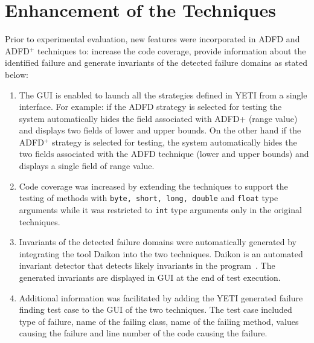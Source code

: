 \section{Enhancement of the Techniques}
Prior to experimental evaluation, new features were incorporated in ADFD and ADFD$^+$ techniques to: increase the code coverage, provide information about the identified failure and generate invariants of the detected failure domains as stated below: 
\begin{enumerate}

\item The GUI is enabled to launch all the strategies defined in YETI from a single interface. For example: if the ADFD strategy is selected for testing the system automatically hides the field associated with ADFD+ (range value) and displays two fields of lower and upper bounds. On the other hand if the ADFD$^+$ strategy is selected for testing, the system automatically hides the two fields associated with the ADFD technique (lower and upper bounds) and displays a single field of range value.

\clearpage
\newpage 

\item Code coverage was increased by extending the techniques to support the testing of methods with \verb+byte, short, long, double+ and \verb+float+ type arguments while it was restricted to \verb+int+ type arguments only in the original techniques.

\item Invariants of the detected failure domains were automatically generated by integrating the tool Daikon into the two techniques. Daikon is an automated invariant detector that detects likely invariants in the program~\cite{ernst2007daikon}. The generated invariants are displayed in GUI at the end of test execution. 

\item Additional information was facilitated by adding the YETI generated failure finding test case to the GUI of the two techniques. The test case included type of failure, name of the failing class, name of the failing method, values causing the failure and line number of the code causing the failure.





\end{enumerate}
